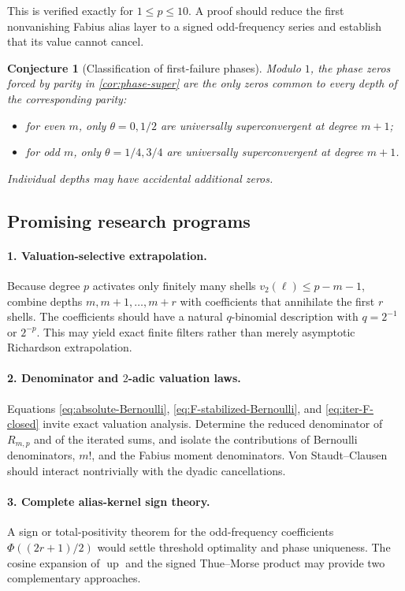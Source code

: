 \documentclass[11pt]{article}
\newtheorem{conjecture}[theorem]{Conjecture}
\theoremstyle{definition}
\newcommand{\Up}{\operatorname{up}}
\begin{document}
This is verified exactly for $1\le p\le10$.  A proof should reduce the first
nonvanishing Fabius alias layer to a signed odd-frequency series and establish
that its value cannot cancel.

\begin{conjecture}[Classification of first-failure phases]
\label{conj:phase-classification}
Modulo $1$, the phase zeros forced by parity in \cref{cor:phase-super} are the
only zeros common to every depth of the corresponding parity:
\begin{itemize}[leftmargin=2em]
\item for even $m$, only $\theta=0,1/2$ are universally superconvergent at
degree $m+1$;
\item for odd $m$, only $\theta=1/4,3/4$ are universally superconvergent at
degree $m+1$.
\end{itemize}
Individual depths may have accidental additional zeros.
\end{conjecture}

\subsection{Promising research programs}

\paragraph{1. Valuation-selective extrapolation.}
Because degree $p$ activates only finitely many shells
$v_2(\ell)\le p-m-1$, combine depths $m,m+1,\dots,m+r$ with coefficients that
annihilate the first $r$ shells.  The coefficients should have a natural
$q$-binomial description with $q=2^{-1}$ or $2^{-p}$.  This may yield exact
finite filters rather than merely asymptotic Richardson extrapolation.

\paragraph{2. Denominator and $2$-adic valuation laws.}
Equations \eqref{eq:absolute-Bernoulli},
\eqref{eq:F-stabilized-Bernoulli}, and \eqref{eq:iter-F-closed} invite exact
valuation analysis.  Determine the reduced denominator of $R_{m,p}$ and of
the iterated sums, and isolate the contributions of Bernoulli denominators,
$m!$, and the Fabius moment denominators.  Von Staudt--Clausen should interact
nontrivially with the dyadic cancellations.

\paragraph{3. Complete alias-kernel sign theory.}
A sign or total-positivity theorem for the odd-frequency coefficients
$\Phi((2r+1)/2)$ would settle threshold optimality and phase uniqueness.  The
cosine expansion of $\Up$ and the signed Thue--Morse product may provide two
complementary approaches.
\end{document}
